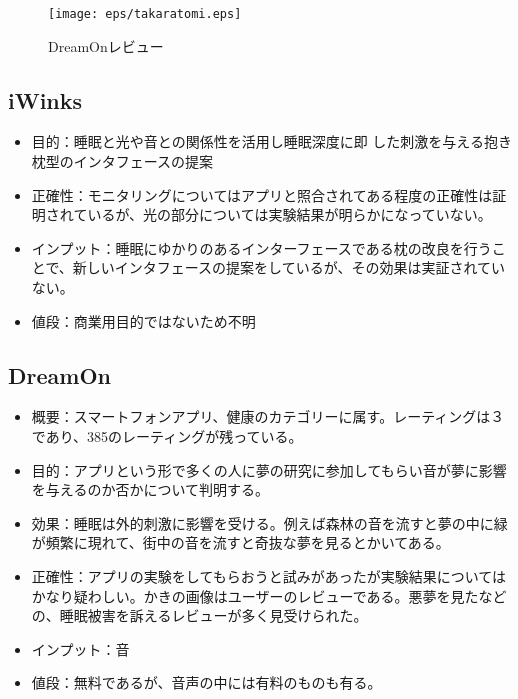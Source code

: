 \begin{figure}[htbp]
\begin{center}
\texttt{[image: eps/takaratomi.eps]}
\caption{DreamOnレビュー}
\label{DreamOnレビュー}
\end{center}
\end{figure}

\subsection{iWinks}
\begin{itemize}
\item 目的：睡眠と光や音との関係性を活用し睡眠深度に即 した刺激を与える抱き枕型のインタフェースの提案 \cite{iWinks}
\item 正確性：モニタリングについてはアプリと照合されてある程度の正確性は証明されているが、光の部分については実験結果が明らかになっていない。
\item インプット：睡眠にゆかりのあるインターフェースである枕の改良を行うことで、新しいインタフェースの提案をしているが、その効果は実証されていない。
\item 値段：商業用目的ではないため不明
\end{itemize}

\subsection{DreamOn}
\begin{itemize}
\item 概要：スマートフォンアプリ、健康のカテゴリーに属す。レーティングは３であり、385のレーティングが残っている。
\item 目的：アプリという形で多くの人に夢の研究に参加してもらい音が夢に影響を与えるのか否かについて判明する。 \cite{dreamOn}
\item 効果：睡眠は外的刺激に影響を受ける。例えば森林の音を流すと夢の中に緑が頻繁に現れて、街中の音を流すと奇抜な夢を見るとかいてある。
\item 正確性：アプリの実験をしてもらおうと試みがあったが実験結果についてはかなり疑わしい。かきの画像はユーザーのレビューである。悪夢を見たなどの、睡眠被害を訴えるレビューが多く見受けられた。
\item インプット：音
\item 値段：無料であるが、音声の中には有料のものも有る。
\end{itemize}

